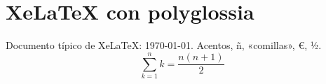 \documentclass{article}
\begin{document}
\section{XeLaTeX con polyglossia}
Documento típico de XeLaTeX: \today. Acentos, ñ, «comillas», €, ½.
\[ \sum_{k=1}^{n} k = \frac{n(n+1)}{2} \]
\end{document}

